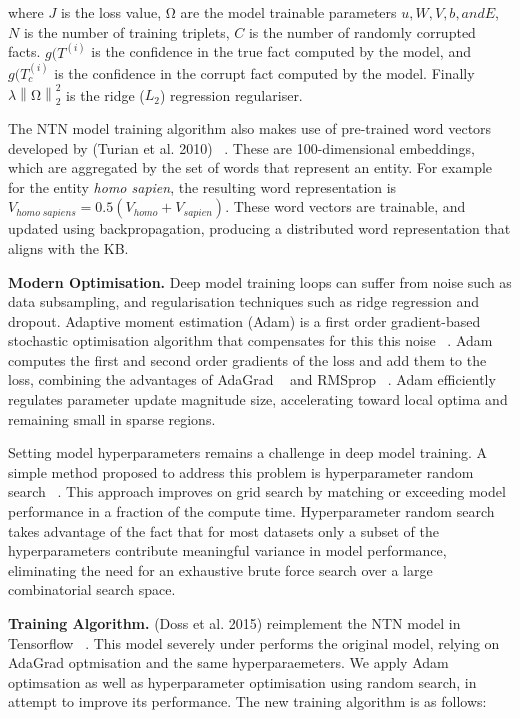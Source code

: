\noindent where $J$ is the loss value, $\si{\ohm}$ are the model trainable parameters $u, W, V, b, and E$, $N$ is the number of training triplets, $C$ is the number of randomly corrupted facts. $g(T^{(i)}$ is the confidence in the true fact computed by the model, and $ g(T_c^{(i)}$ is the confidence in the corrupt fact computed by the model. Finally $\lambda\left\lVert \si{\ohm} \right\rVert_2^2$ is the ridge ($L_2$) regression regulariser. \par

\noindent The NTN model training algorithm also makes use of pre-trained word vectors developed by (Turian et al. 2010) ~\citep{turian2010word}. These are 100-dimensional embeddings, which are aggregated by the set of words that represent an entity. For example for the entity \textit{homo sapien}, the resulting word representation is $V_{homo \; sapiens} = 0.5(V_{homo} + V_{sapien})$. These word vectors are trainable, and updated using backpropagation, producing a distributed word representation that aligns with the KB. \par

\noindent \textbf{Modern Optimisation.} Deep model training loops can suffer from noise such as data subsampling, and regularisation techniques such as ridge regression and dropout. Adaptive moment estimation (Adam) is a first order gradient-based stochastic optimisation algorithm that compensates for this this noise \unskip ~\citep{kingma2014adam}. Adam computes the first and second order gradients of the loss and add them to the loss, combining the advantages of AdaGrad ~\citep{duchi2011adaptive} and RMSprop ~\citep{tieleman2012lecture}. Adam efficiently regulates parameter update magnitude size, accelerating toward local optima and remaining small in sparse regions. \par

\noindent Setting model hyperparameters remains a challenge in deep model training. A simple method proposed to address this problem is hyperparameter random search \unskip ~\citep{bergstra2012random}. This approach improves on grid search by matching or exceeding model performance in a fraction of the compute time. Hyperparameter random search takes advantage of the fact that for most datasets only a subset of the hyperparameters contribute meaningful variance in model performance, eliminating the need for an exhaustive brute force search over a large combinatorial search space. \par

\noindent \textbf{Training Algorithm.} (Doss et al. 2015) reimplement the NTN model in Tensorflow \unskip ~\citep{abadi2016tensorflow}. This model severely under performs the original model, relying on AdaGrad optmisation and the same hyperparaemeters. We apply Adam optimsation as well as hyperparameter optimisation using random search, in attempt to improve its performance. The new training algorithm is as follows: 

